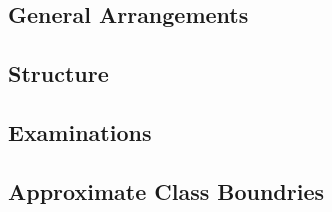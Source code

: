 \newpage
{}

\begin{multicols}{2}

\section{General Arrangements}
  \subsection{Structure}
    \lipsum[1-2]
  \subsection{Examinations}
    \lipsum[3]

\vfill\null\columnbreak

  \subsection{Approximate Class Boundries}
    \lipsum[5-6]

\vfill\null\pagebreak


\end{multicols}